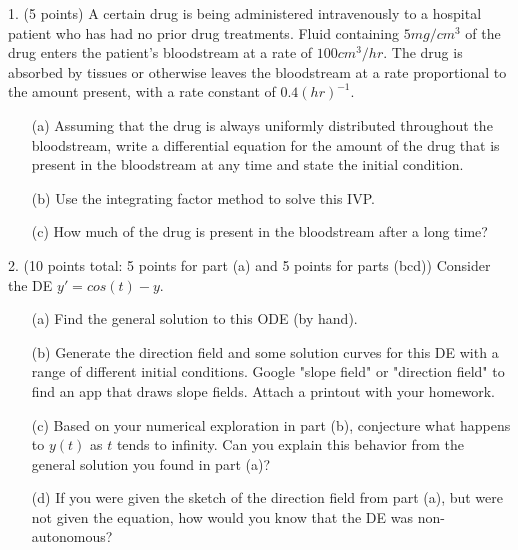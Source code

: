 \documentclass[12pt,letterpaper]{hmcpset}
\begin{document}
\begin{problem}
1. (5 points) A certain drug is being administered intravenously to a hospital patient who has
had no prior drug treatments. Fluid containing $5 mg/cm^3$ of the drug enters the patient’s
bloodstream at a rate of $100 cm^3/hr$. The drug is absorbed by tissues or otherwise leaves
the bloodstream at a rate proportional to the amount present, with a rate constant of $0.4
(hr)^{-1}$.

\begin{enumerate}
    \item[(a)] Assuming that the drug is always uniformly distributed throughout the bloodstream,
write a differential equation for the amount of the drug that is present in the bloodstream
at any time and state the initial condition.
    \item[(b)] Use the integrating factor method to solve this IVP.
    \item[(c)] How much of the drug is present in the bloodstream after a long time?
\end{enumerate}

\end{problem}
\newpage

\begin{problem}
2. (10 points total: 5 points for part (a) and 5 points for parts (bcd)) Consider the DE $y' = cos(t)-y$.
\begin{enumerate}
    \item[(a)] Find the general solution to this ODE (by hand).
    \item[(b)] Generate the direction field and some solution curves for this DE with a range of
different initial conditions. Google "slope field" or "direction field" to find an app that
draws slope fields. Attach a printout with your homework.
    \item[(c)] Based on your numerical exploration in part (b), conjecture what happens to $y(t)$ as $t$
tends to infinity. Can you explain this behavior from the general solution you found in
part (a)?
    \item[(d)] If you were given the sketch of the direction field from part (a), but were not given the
equation, how would you know that the DE was non-autonomous?
\end{enumerate}
\end{problem}
\newpage
\end{document}
